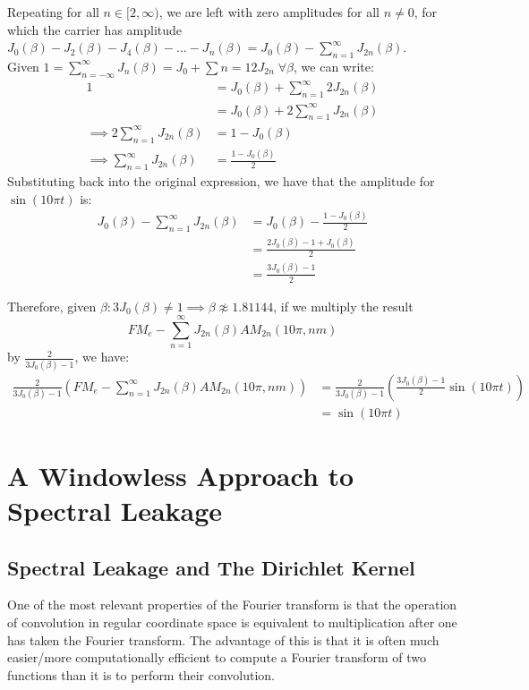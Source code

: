 \documentclass[11pt,twoside]{report}
\numberwithin{thm}{section}
\numberwithin{equation}{section}
\begin{document}
Repeating for all $n \in [2, \infty) $, we are left with zero amplitudes for all $n \neq 0$, for which the carrier has amplitude $J_0(\beta) - J_2(\beta) - J_4(\beta) - ... - J_n(\beta) = J_0(\beta) - \sum_{n=1}^\infty J_{2n}(\beta)$.\\

Given $1 = \sum_{n=-\infty}^\infty J_n(\beta) = J_0 + \sum{n=1} 2J_{2n} \; \forall \beta$, we can write:
\begin{align*}
    1 &= J_0(\beta) + \sum_{n=1}^\infty 2J_{2n}(\beta) \\
    &= J_0(\beta) + 2\sum_{n=1}^\infty J_{2n}(\beta) \\
    \implies 2\sum_{n=1}^\infty J_{2n}(\beta) &= 1 - J_0(\beta)\\
    \implies \sum_{n=1}^\infty J_{2n}(\beta) &= \frac{1- J_0(\beta)}{2}
\end{align*}
Substituting back into the original expression, we have that the amplitude for $\sin(10\pi t)$ is:
\begin{align*}
    J_0(\beta) - \sum_{n=1}^\infty J_{2n}(\beta) &= J_0(\beta) - \frac{1- J_0(\beta)}{2}\\
    &= \frac{2J_0(\beta) - 1 + J_0(\beta)}{2}\\
    &= \frac{3J_0(\beta) - 1}{2}
\end{align*}

Therefore, given $\beta : 3J_0(\beta) \neq 1 \implies \beta \not\approx 1.81144$, if we multiply the result \\
$$FM_e - \sum_{n=1}^\infty J_{2n}(\beta)AM_{2n}(10\pi, nm)$$
by $\displaystyle\frac{2}{3J_0(\beta) - 1}$, we have:
\begin{align*}
    \frac{2}{3J_0(\beta) - 1}\left(FM_e - \sum_{n=1}^\infty J_{2n}(\beta)AM_{2n}(10\pi, nm)\right) &= \frac{2}{3J_0(\beta) - 1}\left(\frac{3J_0(\beta) - 1}{2}\sin(10\pi t)\right)\\
    &= \sin(10\pi t)
\end{align*}


\chapter{A Windowless Approach to Spectral Leakage}

\section{Spectral Leakage and The Dirichlet Kernel}
One of the most relevant properties of the Fourier transform is that the operation of convolution in regular coordinate space is equivalent to multiplication after one has taken the Fourier transform. The advantage of this is that it is often much easier/more computationally efficient to compute a Fourier transform of two functions than it is to perform their convolution. \\
\end{document}
